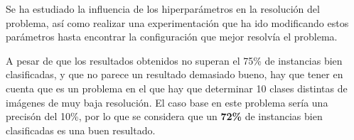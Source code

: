 \documentclass{uc3mpracticas}
\begin{document}
\vspace{4mm}

Se ha estudiado la influencia de los hiperparámetros en la resolución del problema, así como realizar una experimentación que ha ido modificando estos parámetros hasta encontrar la configuración que mejor resolvía el problema.

\vspace{2mm}

A pesar de que los resultados obtenidos no superan el 75\% de instancias bien clasificadas, y que no parece un resultado demasiado bueno, hay que tener en cuenta que es un problema en el que hay que determinar 10 clases distintas de imágenes de muy baja resolución. El caso base en este problema sería una precisón del 10\%, por lo que se considera que un \textbf{72\%} de instancias bien clasificadas es una buen resultado.
\end{document}
